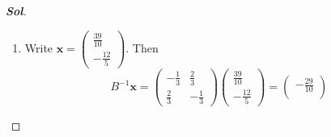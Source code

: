 \begin{enumerate}
\begin{proof}[\normalfont\color{magenta}\bfseries Sol]
\begin{enumerate}
\[\begin{pmatrix}
			0
		\end{pmatrix}.
		\]
		Therefore
		\[
		\mathbf y=B\mathbf z
		=
		\begin{pmatrix}
			1&2\\
			2&1
		\end{pmatrix}
		\begin{pmatrix}
			1\\
			-1
		\end{pmatrix}
		=
		\begin{pmatrix}
			-1\\
			1
		\end{pmatrix}\quad\text{and}\quad
		\mathbf p=B\boldsymbol\alpha
		=
		\begin{pmatrix}
			1&2\\
			2&1
		\end{pmatrix}
		\begin{pmatrix}
			\frac3{10}\\[2pt]
			0
		\end{pmatrix}
		=
		\begin{pmatrix}
			\frac3{10}\\[2pt]
			\frac35
		\end{pmatrix}.
		\]
		So
		\[
		\boxed{
			\begin{pmatrix}
				-0.7\\
				1.6
			\end{pmatrix}
			=
			\begin{pmatrix}
				-1\\
				1
			\end{pmatrix}
			+
			\begin{pmatrix}
				\frac3{10}\\[2pt]
				\frac35
			\end{pmatrix}.
		}
		\]
		\newpage
		\item Write $
		\mathbf x=
		\begin{pmatrix}
			\frac{39}{10}\\[2pt]
			-\frac{12}{5}
		\end{pmatrix}$.
		Then
		\[
		B^{-1}\mathbf x
		=
		\begin{pmatrix}
			-\frac13&\frac23\\[4pt]
			\frac23&-\frac13
		\end{pmatrix}
		\begin{pmatrix}
			\frac{39}{10}\\[2pt]
			-\frac{12}{5}
		\end{pmatrix}
		=
		\begin{pmatrix}
			-\frac{29}{10}\\[2pt]

\end{pmatrix}\]
\end{enumerate}
\end{proof}
\end{enumerate}
